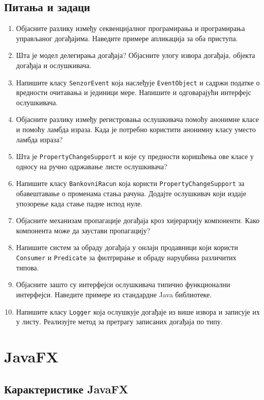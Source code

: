 \section{Питања и задаци}

\begin{enumerate}
\item Објасните разлику између секвенцијалног програмирања и програмирања управљаног догађајима. Наведите примере апликација за оба приступа.
\item Шта је модел делегирања догађаја? Објасните улогу извора догађаја, објекта догађаја и ослушкивача.
\item Напишите класу \texttt{SenzorEvent} која наслеђује \texttt{EventObject} и садржи податке о вредности очитавања и јединици мере. Напишите и одговарајући интерфејс ослушкивача.
\item Објасните разлику између регистровања ослушкивача помоћу анонимне класе и помоћу ламбда израза. Када је потребно користити анонимну класу уместо ламбда израза?
\item Шта је \texttt{PropertyChangeSupport} и које су предности коришћења ове класе у односу на ручно одржавање листе ослушкивача?
\item Напишите класу \texttt{BankovniRacun} која користи \texttt{PropertyChangeSupport} за обавештавање о променама стања рачуна. Додајте ослушкивач који издаје упозорење када стање падне испод нуле.
\item Објасните механизам пропагације догађаја кроз хијерархију компоненти. Како компонента може да заустави пропагацију?
\item Напишите систем за обраду догађаја у онлајн продавници који користи \texttt{Consumer} и \texttt{Predicate} за филтрирање и обраду наруџбина различитих типова.
\item Објасните зашто су интерфејси ослушкивача типично функционални интерфејси. Наведите примере из стандардне Java библиотеке.
\item Напишите класу \texttt{Logger} која ослушкује догађаје из више извора и записује их у листу. Реализујте метод за претрагу записаних догађаја по типу.
\end{enumerate}



\setlength{\parindent}{15pt}
\setlength{\parskip}{0pt}
\chapter{JavaFX}

\section{Карактеристике JavaFX}

